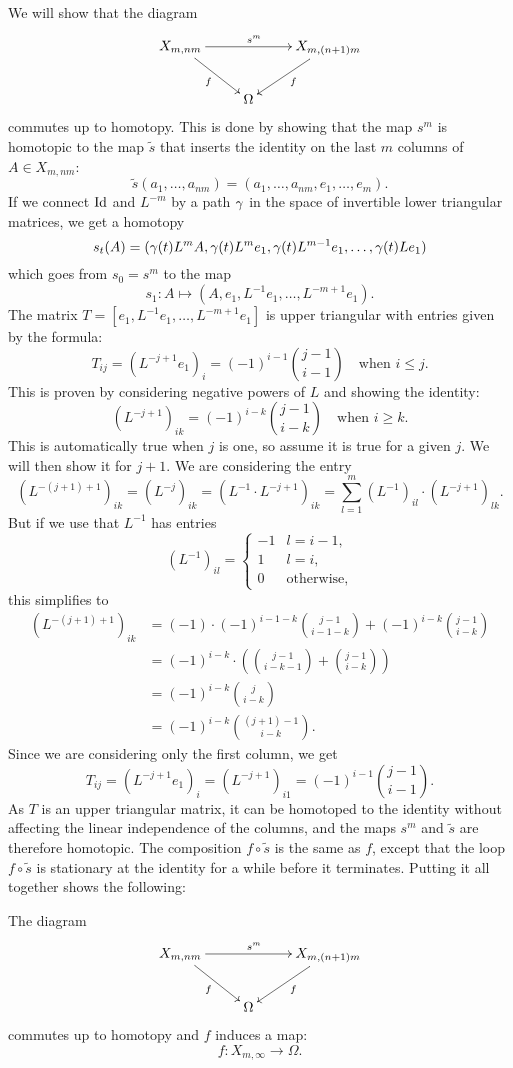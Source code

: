 We will show that the diagram
\[ \xymatrix{ X_{m,nm} \ar[rr]^{s^m}\ar[dr]_f & & X_{m,(n+1)m}
  \ar[dl]^f \\
  & \Omega & } \]
commutes up to homotopy. This is done by showing that the map $s^m$ is
homotopic to the map $\widetilde s$ that inserts the identity on the
last $m$ columns of $A \in X_{m,nm}$:
\[ \widetilde s (a_1,\dots,a_{nm}) =
(a_1,\dots,a_{nm},e_1,\dots,e_m). \]
If we connect $\operatorname{Id}$ and $L^{-m}$ by a path $\gamma$ in the space of
invertible lower triangular matrices, we get a homotopy
\[ s_t(A) = (\gamma(t)L^mA,
\gamma(t)L^me_1,\gamma(t)L^{m-1}e_1,\dots,\gamma(t)Le_1) \]
which goes from $s_0 = s^m$ to the map
\[ s_1 : A \mapsto (A,e_1,L^{-1}e_1,\dots,L^{-m+1}e_1). \]
The matrix $T = [e_1,L^{-1}e_1,\dots,L^{-m+1}e_1]$ is upper
triangular with entries given by the formula:
\[ T_{ij} = (L^{-j+1}e_1)_i = (-1)^{i-1}\binom{j-1}{i-1} \quad
\text{when } i \leq j. \]
This is proven by considering negative powers of $L$ and showing the
identity:
\[ (L^{-j+1})_{ik} = (-1)^{i-k}\binom{j-1}{i-k} \quad \text{when } i
\geq k. \] 
This is automatically true when $j$ is one, so assume it is true for
a given $j$. We will then show it for $j+1$. We are considering the
entry
\[ (L^{-(j+1)+1})_{ik} = (L^{-j})_{ik} = (L^{-1}\cdot L^{-j+1})_{ik} =
\sum_{l=1}^m (L^{-1})_{il} \cdot (L^{-j+1})_{lk}. \]
But if we use that $L^{-1}$ has entries
\[ (L^{-1})_{il} =
\begin{cases}
  -1 & l = i-1, \\
  1 & l = i,  \\
  0 & \text{otherwise},
\end{cases} \]
this simplifies to
\begin{align*}
  (L^{-(j+1)+1})_{ik} &= (-1)\cdot(-1)^{i-1-k}\binom{j-1}{i-1-k}
                        + (-1)^{i-k}\binom{j-1}{i-k} \\
                      &= (-1)^{i-k}\cdot \left( \binom{j-1}{i-k-1} +
                        \binom{j-1}{i-k} \right)\\
                      &= (-1)^{i-k} \binom{j}{i-k} \\
                      &= (-1)^{i-k} \binom{(j+1)-1}{i-k}.
\end{align*}
Since we are considering only the first column, we get
\[ T_{ij} = (L^{-j+1}e_1)_i = (L^{-j+1})_{i1} =
(-1)^{i-1}\binom{j-1}{i-1}. \]
As $T$ is an upper triangular matrix, it can be homotoped to
the identity without affecting the linear independence of the
columns, and the maps $s^m$ and $\widetilde s$ are therefore
homotopic. The composition
$f\circ \widetilde s$ is the same as $f$, except that the loop
$f\circ\widetilde s$ is stationary at the identity for a while before
it terminates. Putting it all together shows the following:
\begin{lemma}
  \label{lem:homotopycommute}
  The diagram
  \[ \xymatrix{ X_{m,nm} \ar[rr]^{s^m}\ar[dr]_{f} & & \ar[dl]^f
    X_{m,(n+1)m} \\
    & \Omega & } \]
  commutes up to homotopy and $f$ induces a map:
  \[ f : X_{m,\infty} \to \Omega. \]
\end{lemma}

